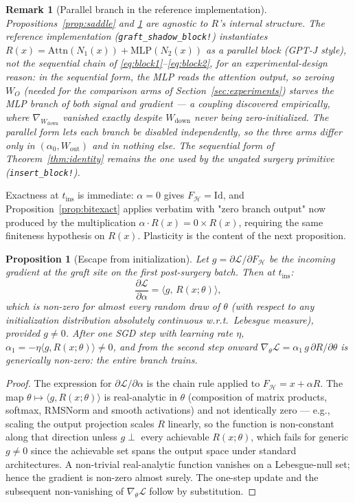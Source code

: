 \documentclass[11pt,a4paper]{article}
\newtheorem{proposition}{Proposition}
\newtheorem{remark}{Remark}
\newcommand{\Hb}{\mathcal{H}}
\newcommand{\Loss}{\mathcal{L}}
\begin{document}
\begin{remark}[Parallel branch in the reference implementation]
\label{rem:parallel}
Propositions~\ref{prop:saddle} and \ref{prop:escape} are agnostic to $R$'s internal structure. The reference implementation (\texttt{graft\_shadow\_block!}) instantiates $R(x) = \mathrm{Attn}(N_1(x)) + \mathrm{MLP}(N_2(x))$ as a \emph{parallel} block (GPT-J style), not the sequential chain of \eqref{eq:block1}--\eqref{eq:block2}, for an experimental-design reason: in the sequential form, the MLP reads the attention output, so zeroing $W_O$ (needed for the comparison arms of Section~\ref{sec:experiments}) starves the MLP branch of both signal and gradient --- a coupling discovered empirically, where $\nabla_{W_{\mathrm{down}}}$ vanished exactly despite $W_{\mathrm{down}}$ never being zero-initialized. The parallel form lets each branch be disabled independently, so the three arms differ only in $(\alpha_0, W_{\mathrm{out}})$ and in nothing else. The sequential form of Theorem~\ref{thm:identity} remains the one used by the ungated surgery primitive (\texttt{insert\_block!}).
\end{remark}

Exactness at $t_{\mathrm{ins}}$ is immediate: $\alpha = 0$ gives $F_{\Hb} = \mathrm{Id}$, and Proposition~\ref{prop:bitexact} applies verbatim with "zero branch output" now produced by the multiplication $\alpha \cdot R(x) = 0 \times R(x)$, requiring the same finiteness hypothesis on $R(x)$. Plasticity is the content of the next proposition.

\begin{proposition}[Escape from initialization]
\label{prop:escape}
Let $g = \partial \Loss / \partial F_{\Hb}$ be the incoming gradient at the graft site on the first post-surgery batch. Then at $t_{\mathrm{ins}}$:
\[
\frac{\partial \Loss}{\partial \alpha} = \langle g,\, R(x;\theta) \rangle,
\]
which is non-zero for almost every random draw of $\theta$ (with respect to any initialization distribution absolutely continuous w.r.t.\ Lebesgue measure), provided $g \neq 0$. After one SGD step with learning rate $\eta$, $\alpha_1 = -\eta \langle g, R(x;\theta)\rangle \neq 0$, and from the second step onward $\nabla_\theta \Loss = \alpha_1 \, g \, \partial R / \partial \theta$ is generically non-zero: the entire branch trains.
\end{proposition}

\begin{proof}
The expression for $\partial \Loss / \partial \alpha$ is the chain rule applied to $F_{\Hb} = x + \alpha R$. The map $\theta \mapsto \langle g, R(x;\theta) \rangle$ is real-analytic in $\theta$ (composition of matrix products, softmax, RMSNorm and smooth activations) and not identically zero --- e.g., scaling the output projection scales $R$ linearly, so the function is non-constant along that direction unless $g \perp$ every achievable $R(x;\theta)$, which fails for generic $g \neq 0$ since the achievable set spans the output space under standard architectures. A non-trivial real-analytic function vanishes on a Lebesgue-null set; hence the gradient is non-zero almost surely. The one-step update and the subsequent non-vanishing of $\nabla_\theta \Loss$ follow by substitution.
\end{proof}
\end{document}
